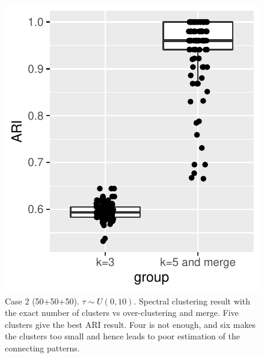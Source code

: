 \begin{figure}[H]
\includegraphics[width=.6\textwidth]{../simulation/plots/case2_overclus_result_boxplot}
\caption{Case 2 (50+50+50). $\tau\sim U(0,10)$. Spectral clustering result with the exact number of clusters vs over-clustering  and merge. 
Five clusters give the best ARI result. Four is not enough, and six makes the clusters too small and hence leads to poor estimation of the connecting patterns.}
\end{figure}


